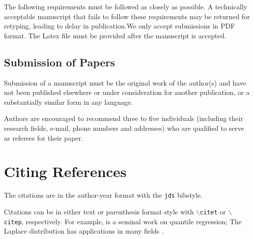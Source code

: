 \documentclass[letterpaper,inpress]{jdsart}
\begin{document}
The following requirements must be followed as closely as possible. A
technically acceptable manuscript that fails to follow these requirements may be
returned for retyping, leading to delay in publication.We only accept
submissions in PDF format. The Latex file must be provided after the manuscript
is accepted.

\hypertarget{submission-of-papers}{%
\subsection{Submission of Papers}\label{submission-of-papers}}

Submission of a manuscript must be the original work of the author(s) and have
not been published elsewhere or under consideration for another publication, or
a substantially similar form in any language.

Authors are encouraged to recommend three to five individuals (including their
research fields, e-mail, phone numbers and addresses) who are qualified to serve
as referees for their paper.

\hypertarget{citing-references}{%
\section{Citing References}\label{citing-references}}

The citations are in the author-year format with the
\texttt{jds} bibstyle.

Citations can be in either text or parenthesis format style with
\texttt{$\backslash$citet} or \texttt{$\backslash$citep},
respectively. For example, \citet{KoenkerBassett1978} is a seminal
work on quantile regression; The Laplace distribution has applications
in many fields \citep{Kotz2001}.



\end{document}
